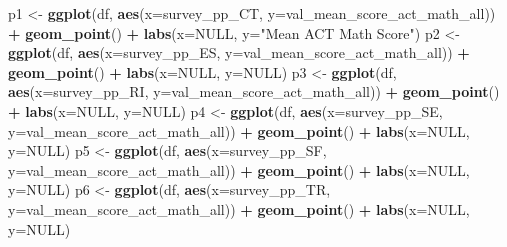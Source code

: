 \documentclass[
  man]{apa6}
\newenvironment{Shaded}{\begin{snugshade}}{\end{snugshade}}
\newcommand{\AttributeTok}[1]{\textcolor[rgb]{0.13,0.29,0.53}{#1}}
\newcommand{\ConstantTok}[1]{\textcolor[rgb]{0.56,0.35,0.01}{#1}}
\newcommand{\FunctionTok}[1]{\textcolor[rgb]{0.13,0.29,0.53}{\textbf{#1}}}
\newcommand{\NormalTok}[1]{#1}
\newcommand{\OtherTok}[1]{\textcolor[rgb]{0.56,0.35,0.01}{#1}}
\newcommand{\SpecialCharTok}[1]{\textcolor[rgb]{0.81,0.36,0.00}{\textbf{#1}}}
\newcommand{\StringTok}[1]{\textcolor[rgb]{0.31,0.60,0.02}{#1}}
\begin{document}
\begin{Shaded}
\begin{Highlighting}[]
\NormalTok{p1 }\OtherTok{\textless{}{-}} \FunctionTok{ggplot}\NormalTok{(df, }\FunctionTok{aes}\NormalTok{(}\AttributeTok{x=}\NormalTok{survey\_pp\_CT, }\AttributeTok{y=}\NormalTok{val\_mean\_score\_act\_math\_all)) }\SpecialCharTok{+} \FunctionTok{geom\_point}\NormalTok{() }\SpecialCharTok{+} \FunctionTok{labs}\NormalTok{(}\AttributeTok{x=}\ConstantTok{NULL}\NormalTok{, }\AttributeTok{y=}\StringTok{"Mean ACT Math Score"}\NormalTok{)}
\NormalTok{p2 }\OtherTok{\textless{}{-}} \FunctionTok{ggplot}\NormalTok{(df, }\FunctionTok{aes}\NormalTok{(}\AttributeTok{x=}\NormalTok{survey\_pp\_ES, }\AttributeTok{y=}\NormalTok{val\_mean\_score\_act\_math\_all)) }\SpecialCharTok{+} \FunctionTok{geom\_point}\NormalTok{() }\SpecialCharTok{+} \FunctionTok{labs}\NormalTok{(}\AttributeTok{x=}\ConstantTok{NULL}\NormalTok{, }\AttributeTok{y=}\ConstantTok{NULL}\NormalTok{)}
\NormalTok{p3 }\OtherTok{\textless{}{-}} \FunctionTok{ggplot}\NormalTok{(df, }\FunctionTok{aes}\NormalTok{(}\AttributeTok{x=}\NormalTok{survey\_pp\_RI, }\AttributeTok{y=}\NormalTok{val\_mean\_score\_act\_math\_all)) }\SpecialCharTok{+} \FunctionTok{geom\_point}\NormalTok{() }\SpecialCharTok{+} \FunctionTok{labs}\NormalTok{(}\AttributeTok{x=}\ConstantTok{NULL}\NormalTok{, }\AttributeTok{y=}\ConstantTok{NULL}\NormalTok{)}
\NormalTok{p4 }\OtherTok{\textless{}{-}} \FunctionTok{ggplot}\NormalTok{(df, }\FunctionTok{aes}\NormalTok{(}\AttributeTok{x=}\NormalTok{survey\_pp\_SE, }\AttributeTok{y=}\NormalTok{val\_mean\_score\_act\_math\_all)) }\SpecialCharTok{+} \FunctionTok{geom\_point}\NormalTok{() }\SpecialCharTok{+} \FunctionTok{labs}\NormalTok{(}\AttributeTok{x=}\ConstantTok{NULL}\NormalTok{, }\AttributeTok{y=}\ConstantTok{NULL}\NormalTok{)}
\NormalTok{p5 }\OtherTok{\textless{}{-}} \FunctionTok{ggplot}\NormalTok{(df, }\FunctionTok{aes}\NormalTok{(}\AttributeTok{x=}\NormalTok{survey\_pp\_SF, }\AttributeTok{y=}\NormalTok{val\_mean\_score\_act\_math\_all)) }\SpecialCharTok{+} \FunctionTok{geom\_point}\NormalTok{() }\SpecialCharTok{+} \FunctionTok{labs}\NormalTok{(}\AttributeTok{x=}\ConstantTok{NULL}\NormalTok{, }\AttributeTok{y=}\ConstantTok{NULL}\NormalTok{)}
\NormalTok{p6 }\OtherTok{\textless{}{-}} \FunctionTok{ggplot}\NormalTok{(df, }\FunctionTok{aes}\NormalTok{(}\AttributeTok{x=}\NormalTok{survey\_pp\_TR, }\AttributeTok{y=}\NormalTok{val\_mean\_score\_act\_math\_all)) }\SpecialCharTok{+} \FunctionTok{geom\_point}\NormalTok{() }\SpecialCharTok{+} \FunctionTok{labs}\NormalTok{(}\AttributeTok{x=}\ConstantTok{NULL}\NormalTok{, }\AttributeTok{y=}\ConstantTok{NULL}\NormalTok{)}


\end{Highlighting}
\end{Shaded}
\end{document}
